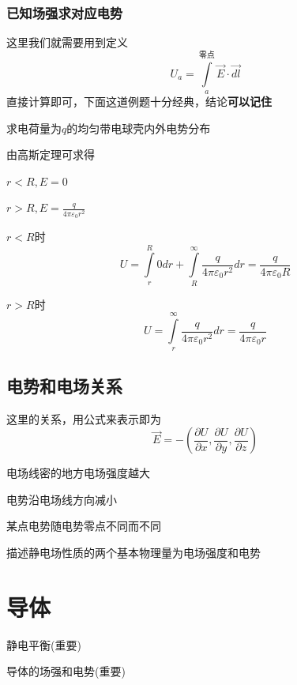 \documentclass[lang=cn,10pt]{elegantbook}
\begin{document}
		\subsubsection{已知场强求对应电势}
		这里我们就需要用到定义
		\begin{equation*}
			U_a=\int\limits_a^{\text{零点}}{\overrightarrow{E}\cdot \overrightarrow{dl}}
		\end{equation*}
		直接计算即可，下面这道例题十分经典，结论\textbf{可以记住}
		\begin{example}
			求电荷量为$q$的均匀带电球壳内外电势分布
		\end{example}
		\begin{solution}
			由高斯定理可求得
			
			$r<R,E=0$
			
			$r>R,E=\frac{q}{4\pi \varepsilon_{0}r^{2}}$
			
			$r<R$时
			\begin{equation*}
				U=\int\limits_r^R{0dr}+\int\limits_R^{\infty}{\frac{q}{4\pi \varepsilon _0r^2}dr}=\frac{q}{4\pi \varepsilon _0R}
			\end{equation*}
			
			$r>R$时
			\begin{equation*}
				U=\int\limits_r^{\infty}{\frac{q}{4\pi \varepsilon _0r^2}dr}=\frac{q}{4\pi \varepsilon _0r}
			\end{equation*}
		\end{solution}
		\subsection{电势和电场关系}
		这里的关系，用公式来表示即为
		\begin{equation*}
			\overrightarrow{E}=-\left( \frac{\partial U}{\partial x},\frac{\partial U}{\partial y},\frac{\partial U}{\partial z} \right)
		\end{equation*}
		\begin{remark}
			电场线密的地方电场强度越大
		\end{remark}
		\begin{remark}
			电势沿电场线方向减小
		\end{remark}
		\begin{remark}
			某点电势随电势零点不同而不同
		\end{remark}
		\begin{remark}
			描述静电场性质的两个基本物理量为电场强度和电势
		\end{remark}
		\section{导体}
		\begin{introduction}
			\item 静电平衡(重要)
			\item 导体的场强和电势(重要)
		\end{introduction}
\end{document}
